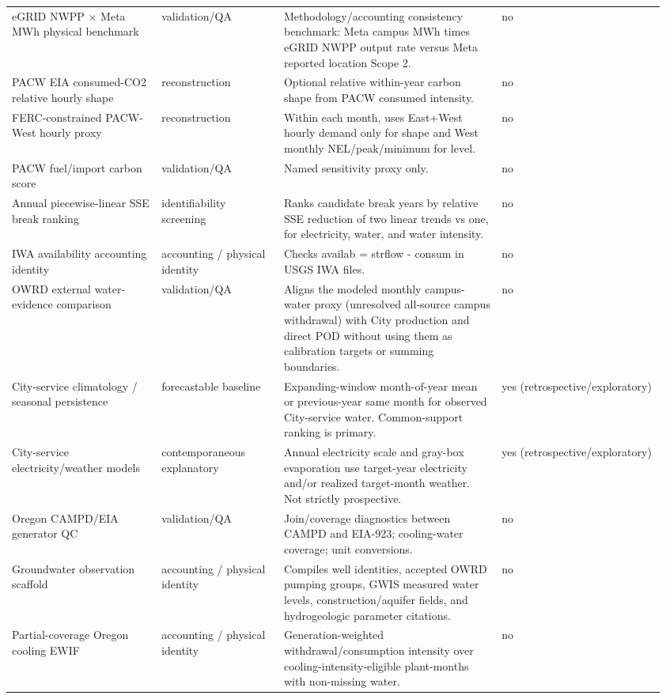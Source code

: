 \documentclass[11pt]{article}
\begin{document}
\begin{longtable}{@{}p{0.22\linewidth}p{0.18\linewidth}p{0.32\linewidth}p{0.24\linewidth}@{}}
eGRID NWPP $\times$ Meta MWh physical benchmark & validation/QA & Methodology/accounting consistency benchmark: Meta campus MWh times eGRID NWPP output rate versus Meta reported location Scope 2. & no\\
PACW EIA consumed-CO2 relative hourly shape & reconstruction & Optional relative within-year carbon shape from PACW consumed intensity. & no\\
FERC-constrained PACW-West hourly proxy & reconstruction & Within each month, uses East+West hourly demand only for shape and West monthly NEL/peak/minimum for level. & no\\
PACW fuel/import carbon score & validation/QA & Named sensitivity proxy only. & no\\
Annual piecewise-linear SSE break ranking & identifiability screening & Ranks candidate break years by relative SSE reduction of two linear trends vs one, for electricity, water, and water intensity. & no\\
IWA availability accounting identity & accounting / physical identity & Checks availab = strflow - consum in USGS IWA files. & no\\
OWRD external water-evidence comparison & validation/QA & Aligns the modeled monthly campus-water proxy (unresolved all-source campus withdrawal) with City production and direct POD without using them as calibration targets or summing boundaries. & no\\
City-service climatology / seasonal persistence & forecastable baseline & Expanding-window month-of-year mean or previous-year same month for observed City-service water. Common-support ranking is primary. & yes (retrospective/exploratory)\\
City-service electricity/weather models & contemporaneous explanatory & Annual electricity scale and gray-box evaporation use target-year electricity and/or realized target-month weather. Not strictly prospective. & yes (retrospective/exploratory)\\
Oregon CAMPD/EIA generator QC & validation/QA & Join/coverage diagnostics between CAMPD and EIA-923; cooling-water coverage; unit conversions. & no\\
Groundwater observation scaffold & accounting / physical identity & Compiles well identities, accepted OWRD pumping groups, GWIS measured water levels, construction/aquifer fields, and hydrogeologic parameter citations. & no\\
Partial-coverage Oregon cooling EWIF & accounting / physical identity & Generation-weighted withdrawal/consumption intensity over cooling-intensity-eligible plant-months with non-missing water. & no\\
\end{longtable}
\endgroup
\end{document}
